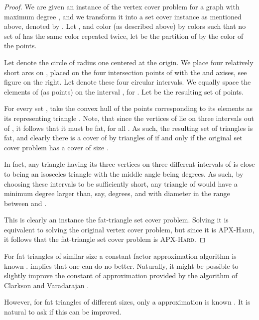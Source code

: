 \documentclass[12pt]{article}
\providecommand{\ComplexityClass}[1]{{{\textcolor[named]{\si{OliveGreen}}{\textsc{#1}}}}}
\providecommand{\APXHard}{{\ComplexityClass{\si{APX}-Hard}}\xspace}
\begin{document}
\begin{proof}
    We are given an instance of the vertex cover problem for a graph
    with maximum degree , and we transform it into a set cover
    instance as mentioned above, denoted by . Let , and color 
    (as described above) by  colors such that no set of
     has the same color repeated twice, let  be the partition of  by the color of the points.
    
    
    Let  denote the circle of radius one centered at the
    origin. We place four relatively short arcs on , placed on the
    four intersection points of  with the  and  axises, see
    figure on the right.  Let  denote these four
    circular intervals.  We equally space the elements of  (as
    points) on the interval , for . Let
     be the resulting set of points.

    For every set , take the convex hull
    of the points corresponding to its elements as its representing
    triangle . Note, that since the vertices of  lie on
    three  intervals out of , it follows
    that it must be fat, for all . As
    such, the resulting set of triangles  is fat, and clearly there is a
    cover of  by  triangles of  if and only if
    the original set cover problem has a cover of size .

    In fact, any triangle having its three vertices on three different
    intervals of  is close to being an isosceles
    triangle with the middle angle being  degrees. As such, by
    choosing these intervals to be sufficiently short, any triangle of
     would have a minimum degree larger than, say,
     degrees, and with diameter in the range between
     and .

    This is clearly an instance the fat-triangle set cover
    problem. Solving it is equivalent to solving the original vertex
    cover problem, but since it is \APXHard, it follows that the
    fat-triangle set cover problem is \APXHard.
\end{proof}



\begin{remark}
    For fat triangles of similar size a constant factor approximation
    algorithm is known \cite{cv-iaags-07}.  
    implies that one can do no better. Naturally, it might be possible
    to slightly improve the constant of approximation provided by the
    algorithm of Clarkson and Varadarajan \cite{cv-iaags-07}.

    However, for fat triangles of different sizes, only a  approximation is known \cite{aes-ssena-09}. It is natural to
    ask if this can be improved.
\end{remark}
\end{document}
